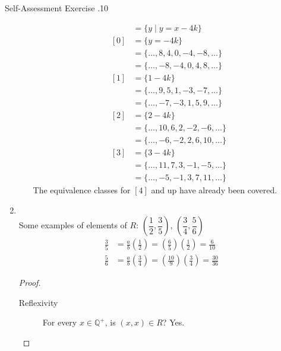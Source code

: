 \documentclass[\main/notes.tex]{subfiles}
\begin{document}
\begin{exercise}{Self-Assessment Exercise \thechapter.10}
\begin{enumerate}
\begin{enumerate}[label=(\alph*)]
\begin{align*}
										&= \{y \mid y = x - 4k\}\\
										[0] &= \{y = - 4k\}\\
										&= \{\ldots, 8, 4, 0, -4, -8, \ldots\}\\
										&= \{\ldots, -8, -4, 0, 4, 8, \ldots\}\\
										[1] &= \{1 - 4k\}\\
										&= \{\ldots, 9, 5, 1, -3, -7, \ldots\}\\
										&= \{\ldots, -7, -3, 1, 5, 9, \ldots\}\\
										[2] &= \{2 - 4k\}\\
										&= \{\ldots, 10, 6, 2, -2, -6, \ldots\}\\
										&= \{\ldots, -6, -2, 2, 6, 10, \ldots\}\\
										[3] &= \{3 - 4k\}\\
										&= \{\ldots, 11, 7, 3, -1, -5, \ldots\}\\
										&= \{\ldots, -5, -1, 3, 7, 11, \ldots\}
									\end{align*}
									The equivalence classes for $[4]$ and up have already been covered.
							\end{enumerate}
						\item {}\\
							Some examples of elements of $R$: $\left(\dfrac{1}{2}, \dfrac{3}{5}\right)$, $\left(\dfrac{3}{4}, \dfrac{5}{6}\right)$
								\begin{align*}
									\frac{3}{5} &= \frac{a}{b}\left(\frac{1}{2}\right) = \left(\frac{6}{5}\right)\left(\frac{1}{2}\right) = \frac{6}{10}\tag*{$a = 6$ and $b = 5$}\\
									\frac{5}{6} &= \frac{a}{b}\left(\frac{3}{4}\right) = \left(\frac{10}{9}\right)\left(\frac{3}{4}\right) = \frac{30}{36}\tag*{$a = 10$ and $b = 9$}
								\end{align*}
							\begin{proof}
								$ $
								\begin{description}
									\item[Reflexivity] For every $x \in \mathbb{Q}^{+}$, is $(x, x) \in R$? Yes.

\end{description}
\end{proof}
\end{enumerate}
\end{exercise}
\end{document}
